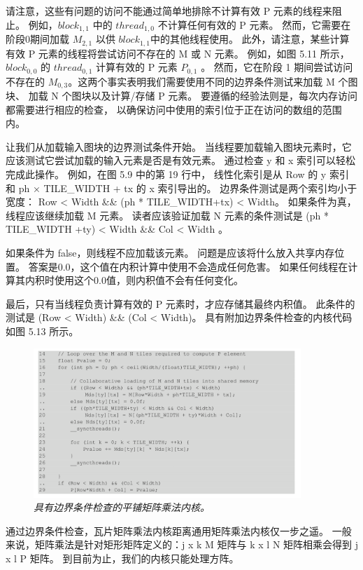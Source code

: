 请注意，这些有问题的访问不能通过简单地排除不计算有效 P 元素的线程来阻止。 
例如，$block_{1,1}$ 中的 $thread_{1,0}$ 不计算任何有效的 P 元素。 
然而，它需要在阶段0期间加载 $M_{2,1}$ 以供 $block_{1,1}$中的其他线程使用。 
此外，请注意，某些计算有效 P 元素的线程将尝试访问不存在的 M 或 N 元素。 
例如，如图 5.11 所示，$block_{0,0}$ 的 $thread_{0,1}$ 计算有效的 P 元素 $P_{0,1}$ 。 
然而，它在阶段 1 期间尝试访问不存在的 $M_{0,3}$。这两个事实表明我们需要使用不同的边界条件测试来加载 M 个图块、
加载 N 个图块以及计算/存储 P 元素。 要遵循的经验法则是，每次内存访问都需要进行相应的检查，
以确保访问中使用的索引位于正在访问的数组的范围内。

让我们从加载输入图块的边界测试条件开始。 当线程要加载输入图块元素时，它应该测试它尝试加载的输入元素是否是有效元素。 
通过检查 y 和 x 索引可以轻松完成此操作。 例如，在图 5.9 中的第 19 行中，
线性化索引是从 Row 的 y 索引和 ph × TILE\_WIDTH + tx 的 x 索引导出的。 
边界条件测试是两个索引均小于宽度： Row < Width \&\& (ph * TILE\_WIDTH+tx) < Width。 
如果条件为真，线程应该继续加载 M 元素。 
读者应该验证加载 N 元素的条件测试是 (ph * TILE\_WIDTH +ty) < Width \&\& Col < Width 。

如果条件为 false，则线程不应加载该元素。 问题是应该将什么放入共享内存位置。 
答案是0.0，这个值在内积计算中使用不会造成任何危害。 如果任何线程在计算其内积时使用这个0.0值，则内积值不会有任何变化。

最后，只有当线程负责计算有效的 P 元素时，才应存储其最终内积值。 
此条件的测试是 (Row < Width) \&\& (Col < Width)。 具有附加边界条件检查的内核代码如图 5.13 所示。

\begin{figure}[H]
	\centering
	\includegraphics[width=0.9\textwidth]{figs/F5.13.png}
	\caption{\textit{具有边界条件检查的平铺矩阵乘法内核。}}
\end{figure}

通过边界条件检查，瓦片矩阵乘法内核距离通用矩阵乘法内核仅一步之遥。 
一般来说，矩阵乘法是针对矩形矩阵定义的：j x k M 矩阵与 k x l N 矩阵相乘会得到 j x l P 矩阵。 
到目前为止，我们的内核只能处理方阵。

